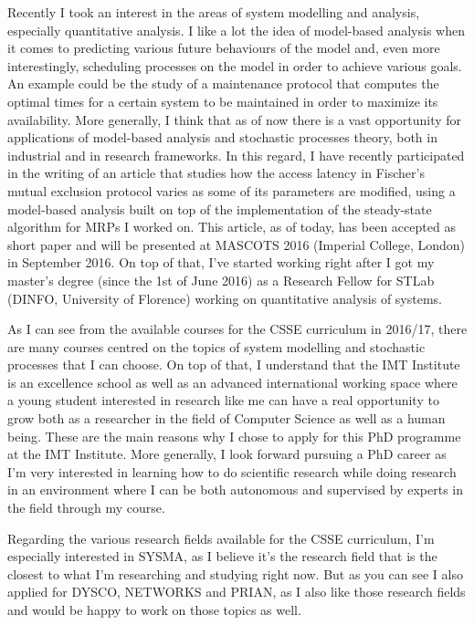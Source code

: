 \documentclass{article}
\begin{document}
    Recently I took an interest in the areas of system modelling and analysis, especially quantitative analysis. I like a lot the idea of model-based analysis when it comes to predicting various future behaviours of the model and, even more interestingly, scheduling processes on the model in order to achieve various goals. An example could be the study of a maintenance protocol that computes the optimal times for a certain system to be maintained in order to maximize its availability. More generally, I think that as of now there is a vast opportunity for applications of model-based analysis and stochastic processes theory, both in industrial and in research frameworks. In this regard, I have recently participated in the writing of an article that studies how the access latency in Fischer's mutual exclusion protocol varies as some of its parameters are modified, using a model-based analysis built on top of the implementation of the steady-state algorithm for MRPs I worked on. This article, as of today, has been accepted as short paper and will be presented at MASCOTS 2016 (Imperial College, London) in September 2016. On top of that, I've started working right after I got my master's degree (since the 1st of June 2016) as a Research Fellow for STLab (DINFO, University of Florence) working on quantitative analysis of systems. \par \bigskip
    
    As I can see from the available courses for the CSSE curriculum in 2016/17, there are many courses centred on the topics of system modelling and stochastic processes that I can choose. On top of that, I understand that the IMT Institute is an excellence school as well as an advanced international working space where a young student interested in research like me can have a real opportunity to grow both as a researcher in the field of Computer Science as well as a human being. These are the main reasons why I chose to apply for this PhD programme at the IMT Institute. More generally, I look forward pursuing a PhD career as I'm very interested in learning how to do scientific research while doing research in an environment where I can be both autonomous and supervised by experts in the field through my course. \par \bigskip
    
    Regarding the various research fields available for the CSSE curriculum, I'm especially interested in SYSMA, as I believe it's the research field that is the closest to what I'm researching and studying right now. But as you can see I also applied for DYSCO, NETWORKS and PRIAN, as I also like those research fields and would be happy to work on those topics as well. \par \bigskip
    
\end{document}
